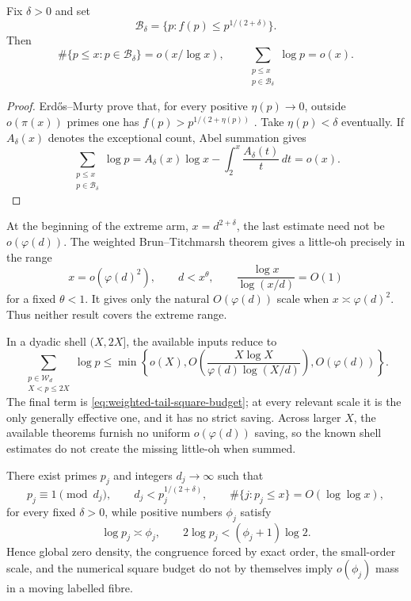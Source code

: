 \begin{proposition}
\label{prop:erdos-murty-weighted-consequence}
Fix $\delta>0$ and set
\[
 \mathcal B_\delta
 =\{p:f(p)\le p^{1/(2+\delta)}\}.
\]
Then
\[
 \#\{p\le x:p\in\mathcal B_\delta\}=o(x/\log x),
 \qquad
 \sum_{\substack{p\le x\\p\in\mathcal B_\delta}}\log p=o(x).
\]
\end{proposition}

\begin{proof}
Erd\H{o}s--Murty prove that, for every positive $\eta(p)\to0$, outside
$o(\pi(x))$ primes one has
$f(p)>p^{1/(2+\eta(p))}$ \cite{ErdosMurty1999}.  Take
$\eta(p)<\delta$ eventually.  If $A_\delta(x)$ denotes the exceptional
count, Abel summation gives
\[
 \sum_{\substack{p\le x\\p\in\mathcal B_\delta}}\log p
 =A_\delta(x)\log x-
   \int_2^x\frac{A_\delta(t)}t\,dt=o(x).
\]
\end{proof}

At the beginning of the extreme arm, $x=d^{2+\delta}$, the last estimate
need not be $o(\varphi(d))$.  The weighted Brun--Titchmarsh theorem
\cite[Theorem~2.4]{MurtySeguin2019} gives a little-oh precisely in the
range
\[
 x=o(\varphi(d)^2),\qquad d<x^\theta,\qquad
 \frac{\log x}{\log(x/d)}=O(1)
\]
for a fixed $\theta<1$.  It gives only the natural $O(\varphi(d))$
scale when $x\asymp\varphi(d)^2$.  Thus neither result covers the
extreme range.

In a dyadic shell $(X,2X]$, the available inputs reduce to
\begin{equation}\label{eq:three-coarse-shell-bounds}
 \sum_{\substack{p\in\mathcal W_d\\X<p\le2X}}\log p
 \le\min\left\{
 o(X),
 O\left(\frac{X\log X}{\varphi(d)\log(X/d)}\right),
 O(\varphi(d))
 \right\}.
\end{equation}
The final term is \eqref{eq:weighted-tail-square-budget}; at every
relevant scale it is the only generally effective one, and it has no
strict saving.  Across larger $X$, the available theorems furnish no
uniform $o(\varphi(d))$ saving, so the known shell estimates do not create
the missing little-oh when summed.

\begin{proposition}
\label{prop:weighted-tail-coarse-nogo}
There exist primes $p_j$ and integers $d_j\to\infty$ such that
\[
 p_j\equiv1\pmod {d_j},\qquad
 d_j<p_j^{1/(2+\delta)},\qquad
 \#\{j:p_j\le x\}=O(\log\log x),
\]
for every fixed $\delta>0$, while positive numbers $\phi_j$ satisfy
\[
 \log p_j\asymp\phi_j,\qquad
 2\log p_j<(\phi_j+1)\log2.
\]
Hence global zero density, the congruence forced by exact order, the
small-order scale, and the numerical square budget do not by themselves
imply $o(\phi_j)$ mass in a moving labelled fibre.
\end{proposition}


